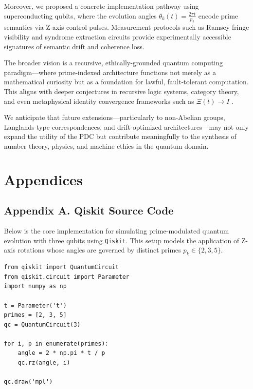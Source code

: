 \documentclass[12]{amsart}
\theoremstyle{plain}
\begin{document}
Moreover, we proposed a concrete implementation pathway using superconducting qubits, where the evolution angles $\theta_k(t) = \frac{2\pi t}{p_k}$ encode prime semantics via Z-axis control pulses. Measurement protocols such as Ramsey fringe visibility and syndrome extraction circuits provide experimentally accessible signatures of semantic drift and coherence loss.

The broader vision is a recursive, ethically-grounded quantum computing paradigm—where prime-indexed architecture functions not merely as a mathematical curiosity but as a foundation for lawful, fault-tolerant computation. This aligns with deeper conjectures in recursive logic systems, category theory, and even metaphysical identity convergence frameworks such as $\Xi(t) \rightarrow I$ \cite{total_unity}.

We anticipate that future extensions—particularly to non-Abelian groups, Langlands-type correspondences, and drift-optimized architectures—may not only expand the utility of the PDC but contribute meaningfully to the synthesis of number theory, physics, and machine ethics in the quantum domain.



\nocite{*}



\appendix

\section*{Appendices}

\subsection*{Appendix A. Qiskit Source Code}

Below is the core implementation for simulating prime-modulated quantum evolution with three qubits using \texttt{Qiskit}. This setup models the application of Z-axis rotations whose angles are governed by distinct primes \( p_k \in \{2, 3, 5\} \).

\begin{verbatim}
from qiskit import QuantumCircuit
from qiskit.circuit import Parameter
import numpy as np

t = Parameter('t')
primes = [2, 3, 5]
qc = QuantumCircuit(3)

for i, p in enumerate(primes):
    angle = 2 * np.pi * t / p
    qc.rz(angle, i)

qc.draw('mpl')
\end{verbatim}
\end{document}
